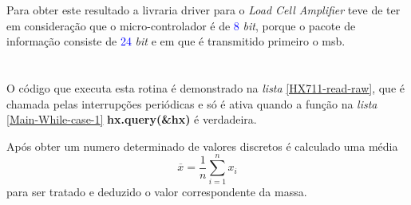 Para obter este resultado a livraria driver para o \textit{Load Cell Amplifier} teve de ter em consideração que o micro-controlador é de \textcolor{blue}{8} \textit{bit}, porque o pacote de informação consiste de \textcolor{blue}{24} \textit{bit} e em que é transmitido primeiro o \ac{msb}.
\\
\\
\\
O código que executa esta rotina é demonstrado na \textit{lista} \ref{HX711-read-raw}, que é chamada pelas interrupções periódicas e só é ativa quando a função na \textit{lista} \ref{Main-While-case-1} \textbf{hx.query(\&hx)} é verdadeira.
\\
{ \tiny
	
}
\newpage
{ \tiny
	
}
Após obter um numero determinado de valores discretos é calculado uma média
\begin{equation}
	\label{eq:Mean}
	\overline{x}  =  \frac{1}{n}\sum_{i=1}^n x_i
\end{equation}
para ser tratado e deduzido o valor correspondente da massa.
\newpage
